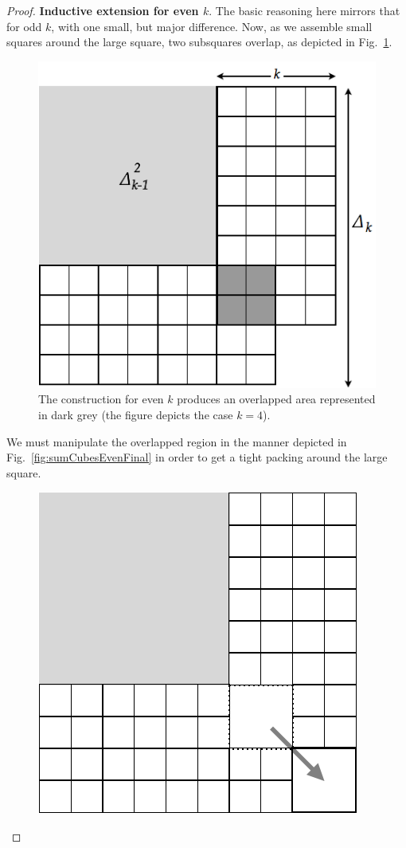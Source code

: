 \begin{proof}
\medskip

{\bf Inductive extension for even $k$}.
The basic reasoning here mirrors that for odd $k$, with one small, but major difference.   Now, 
as we assemble small squares around the large square, two subsquares overlap, as depicted
in Fig.~\ref{fig:sumCubesEven}.
\begin{figure}[hbt]
\begin{center}
       \includegraphics[scale=0.35]{FiguresMaths/SumCubesEven}
\caption{The construction for even $k$ produces  an overlapped area
represented in dark grey (the figure depicts the case $k=4$).}
       \label{fig:sumCubesEven}
\end{center}
\end{figure}
We must manipulate the overlapped region in the manner depicted in Fig.~\ref{fig:sumCubesEvenFinal} 
in order to get a tight packing around the large square.
\begin{figure}[hbt]
\begin{center}
       \includegraphics[scale=0.35]{FiguresMaths/SumCubesEvenFinal}

\end{center}
\end{figure}
\end{proof}

